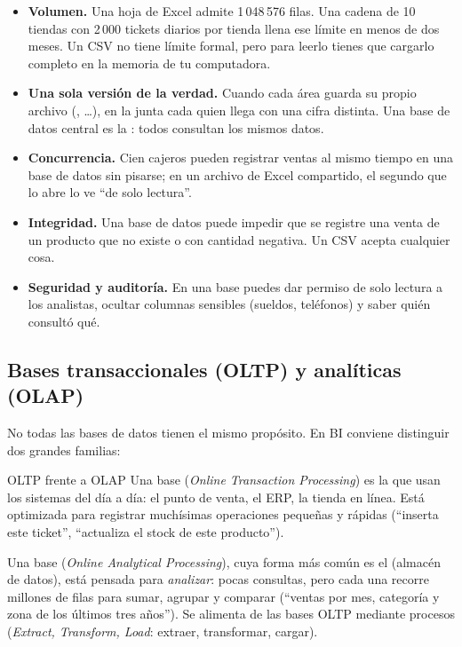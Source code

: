 \begin{itemize}\sloppy
  \item \textbf{Volumen.} Una hoja de Excel admite 1\,048\,576 filas. Una
        cadena de 10 tiendas con 2\,000 tickets diarios por tienda llena ese
        límite en menos de dos meses. Un CSV no tiene límite formal, pero
        para leerlo tienes que cargarlo completo en la memoria de tu
        computadora.
  \item \textbf{Una sola versión de la verdad.} Cuando cada área guarda su
        propio archivo (,
        \ldots), en la junta cada quien
        llega con una cifra distinta. Una base de datos central es la
        : todos consultan los mismos
        datos.
  \item \textbf{Concurrencia.} Cien cajeros pueden registrar ventas al mismo
        tiempo en una base de datos sin pisarse; en un archivo de Excel
        compartido, el segundo que lo abre lo ve ``de solo lectura''.
  \item \textbf{Integridad.} Una base de datos puede impedir que se registre
        una venta de un producto que no existe o con cantidad negativa. Un
        CSV acepta cualquier cosa.
  \item \textbf{Seguridad y auditoría.} En una base puedes dar permiso de
        solo lectura a los analistas, ocultar columnas sensibles (sueldos,
        teléfonos) y saber quién consultó qué.
\end{itemize}

\subsection{Bases transaccionales (OLTP) y analíticas (OLAP)}

No todas las bases de datos tienen el mismo propósito. En BI conviene
distinguir dos grandes familias:

\begin{concepto}{OLTP frente a OLAP}
Una base  (\emph{Online Transaction Processing}) es la que
usan los sistemas del día a día: el punto de venta, el ERP, la tienda en
línea. Está optimizada para registrar muchísimas operaciones pequeñas y
rápidas (``inserta este ticket'', ``actualiza el stock de este producto'').

Una base  (\emph{Online Analytical Processing}), cuya forma
más común es el  (almacén de datos), está pensada
para \emph{analizar}: pocas consultas, pero cada una recorre millones de
filas para sumar, agrupar y comparar (``ventas por mes, categoría y zona de
los últimos tres años''). Se alimenta de las bases OLTP mediante procesos
 (\emph{Extract, Transform, Load}: extraer, transformar,
cargar).
\end{concepto}

